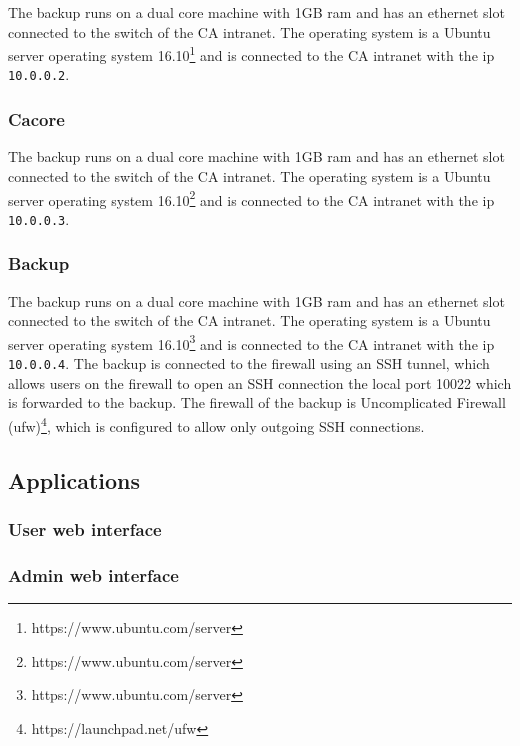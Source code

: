 \documentclass[english]{article}
\begin{document}
The backup runs on a dual core machine with 1GB ram and has an ethernet slot connected to the switch of the CA intranet. The operating system is a Ubuntu server operating system 16.10\footnote{https://www.ubuntu.com/server} and is connected to the CA intranet with the ip \texttt{10.0.0.2}.



\subsubsection{Cacore}

The backup runs on a dual core machine with 1GB ram and has an ethernet slot connected to the switch of the CA intranet. The operating system is a Ubuntu server operating system 16.10\footnote{https://www.ubuntu.com/server} and is connected to the CA intranet with the ip \texttt{10.0.0.3}.



\subsubsection{Backup}

The backup runs on a dual core machine with 1GB ram and has an ethernet slot connected to the switch of the CA intranet. The operating system is a Ubuntu server operating system 16.10\footnote{https://www.ubuntu.com/server} and is connected to the CA intranet with the ip \texttt{10.0.0.4}. The backup is connected to the firewall using an SSH tunnel, which allows users on the firewall to open an SSH connection the local port 10022 which is forwarded to the backup. The firewall of the backup is Uncomplicated Firewall (ufw)\footnote{https://launchpad.net/ufw}, which is configured to allow only outgoing SSH connections.



\subsection{Applications}



\subsubsection{User web interface}



\subsubsection{Admin web interface}
\end{document}
